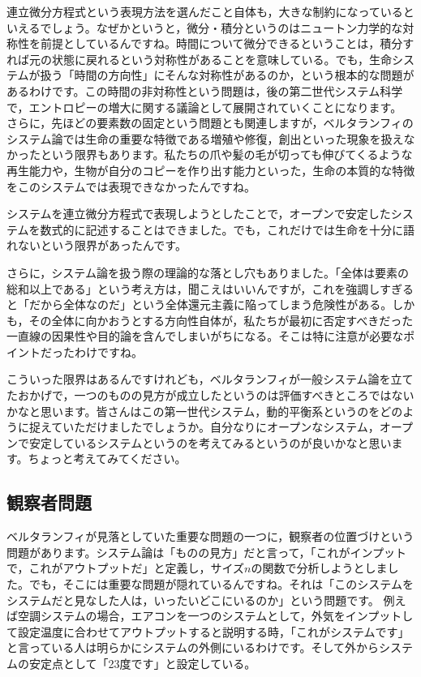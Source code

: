 \documentclass{ltjsbook}
\begin{document}
連立微分方程式という表現方法を選んだこと自体も，大きな制約になっているといえるでしょう。なぜかというと，微分・積分というのはニュートン力学的な対称性を前提としているんですね。時間について微分できるということは，積分すれば元の状態に戻れるという対称性があることを意味している。でも，生命システムが扱う「時間の方向性」にそんな対称性があるのか，という根本的な問題があるわけです。この時間の非対称性という問題は，後の第二世代システム科学で，エントロピーの増大に関する議論として展開されていくことになります。
さらに，先ほどの要素数の固定という問題とも関連しますが，ベルタランフィのシステム論では生命の重要な特徴である増殖や修復，創出といった現象を扱えなかったという限界もあります。私たちの爪や髪の毛が切っても伸びてくるような再生能力や，生物が自分のコピーを作り出す能力といった，生命の本質的な特徴をこのシステムでは表現できなかったんですね。

システムを連立微分方程式で表現しようとしたことで，オープンで安定したシステムを数式的に記述することはできました。でも，これだけでは生命を十分に語れないという限界があったんです。

さらに，システム論を扱う際の理論的な落とし穴もありました。「全体は要素の総和以上である」という考え方は，聞こえはいいんですが，これを強調しすぎると「だから全体なのだ」という全体還元主義に陥ってしまう危険性がある。しかも，その全体に向かおうとする方向性自体が，私たちが最初に否定すべきだった一直線の因果性や目的論を含んでしまいがちになる。そこは特に注意が必要なポイントだったわけですね。

こういった限界はあるんですけれども，ベルタランフィが一般システム論を立てたおかげで，一つのものの見方が成立したというのは評価すべきところではないかなと思います。皆さんはこの第一世代システム，動的平衡系というのをどのように捉えていただけましたでしょうか。自分なりにオープンなシステム，オープンで安定しているシステムというのを考えてみるというのが良いかなと思います。ちょっと考えてみてください。
\subsection{観察者問題}
ベルタランフィが見落としていた重要な問題の一つに，観察者の位置づけという問題があります。システム論は「ものの見方」だと言って，「これがインプットで，これがアウトプットだ」と定義し，サイズ$n$の関数で分析しようとしました。でも，そこには重要な問題が隠れているんですね。それは「このシステムをシステムだと見なした人は，いったいどこにいるのか」という問題です。
例えば空調システムの場合，エアコンを一つのシステムとして，外気をインプットして設定温度に合わせてアウトプットすると説明する時，「これがシステムです」と言っている人は明らかにシステムの外側にいるわけです。そして外からシステムの安定点として「23度です」と設定している。
\end{document}
